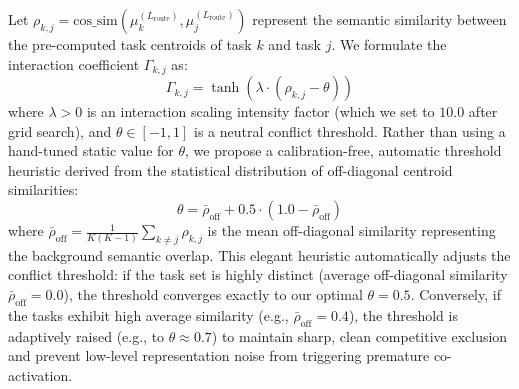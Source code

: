 Let $\rho_{k, j} = \text{cos\_sim}(\mu^{(L_{\text{route}})}_k, \mu^{(L_{\text{route}})}_j)$ represent the semantic similarity between the pre-computed task centroids of task $k$ and task $j$. We formulate the interaction coefficient $\Gamma_{k, j}$ as:
\begin{equation}
    \Gamma_{k, j} = \tanh\left( \lambda \cdot (\rho_{k, j} - \theta) \right)
\end{equation}
where $\lambda > 0$ is an interaction scaling intensity factor (which we set to $10.0$ after grid search), and $\theta \in [-1, 1]$ is a neutral conflict threshold. Rather than using a hand-tuned static value for $\theta$, we propose a calibration-free, automatic threshold heuristic derived from the statistical distribution of off-diagonal centroid similarities:
\begin{equation}
    \theta = \bar{\rho}_{\text{off}} + 0.5 \cdot (1.0 - \bar{\rho}_{\text{off}})
\end{equation}
where $\bar{\rho}_{\text{off}} = \frac{1}{K(K-1)} \sum_{k \neq j} \rho_{k, j}$ is the mean off-diagonal similarity representing the background semantic overlap. This elegant heuristic automatically adjusts the conflict threshold: if the task set is highly distinct (average off-diagonal similarity $\bar{\rho}_{\text{off}} = 0.0$), the threshold converges exactly to our optimal $\theta = 0.5$. Conversely, if the tasks exhibit high average similarity (e.g., $\bar{\rho}_{\text{off}} = 0.4$), the threshold is adaptively raised (e.g., to $\theta \approx 0.7$) to maintain sharp, clean competitive exclusion and prevent low-level representation noise from triggering premature co-activation.


